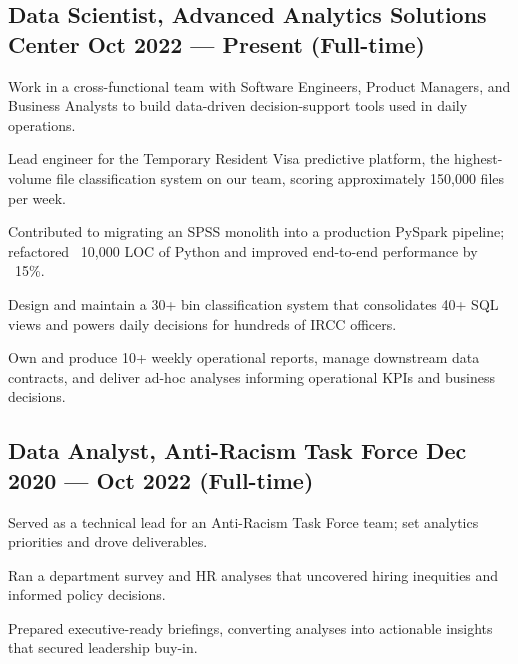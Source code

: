 \subsection{{Data Scientist, Advanced Analytics Solutions Center \hfill Oct 2022 --- Present (Full-time)}}
\begin{zitemize}
    \setlength\itemsep{0.3em}
    \item Work in a cross-functional team with Software Engineers, Product Managers, and Business Analysts to build data-driven decision-support tools used in daily operations.
    \item Lead engineer for the Temporary Resident Visa predictive platform, the highest-volume file classification system on our team, scoring approximately 150{,}000 files per week.
    \item Contributed to migrating an SPSS monolith into a production PySpark pipeline; refactored ~10{,}000 LOC of Python and improved end-to-end performance by ~15\%.
    \item Design and maintain a 30+ bin classification system that consolidates 40+ SQL views and powers daily decisions for hundreds of IRCC officers.
    \item Own and produce 10+ weekly operational reports, manage downstream data contracts, and deliver ad-hoc analyses informing operational KPIs and business decisions.
\end{zitemize}
\vspace{0.5em}

\subsection{{Data Analyst, Anti-Racism Task Force \hfill Dec 2020 --- Oct 2022 (Full-time)}}
\begin{zitemize}
    \setlength\itemsep{0.3em}
    \item Served as a technical lead for an Anti-Racism Task Force team; set analytics priorities and drove deliverables.
    \item Ran a department survey and HR analyses that uncovered hiring inequities and informed policy decisions.
    \item Prepared executive-ready briefings, converting analyses into actionable insights that secured leadership buy-in.
\end{zitemize}


